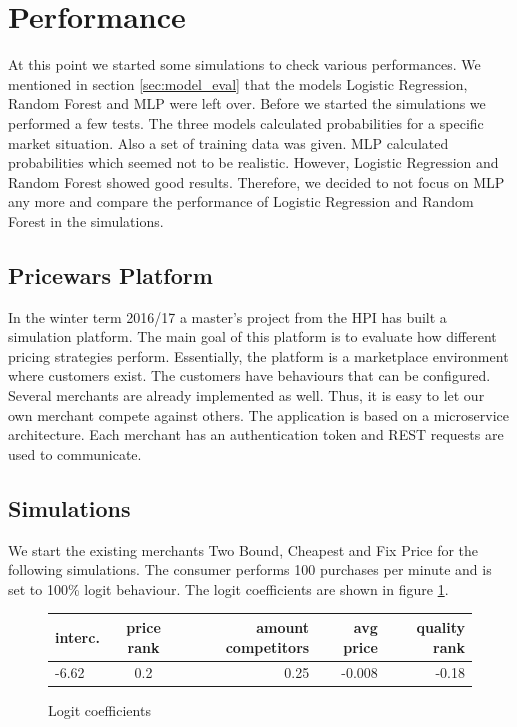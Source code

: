 \section{Performance}
    At this point we started some simulations to check various performances. We mentioned in section \ref{sec:model_eval} that the models Logistic Regression, Random Forest and MLP were left over. Before we started the simulations we performed a few tests. The three models calculated probabilities for a specific market situation. Also a set of training data was given. MLP calculated probabilities which seemed not to be realistic. However, Logistic Regression and Random Forest showed good results. Therefore, we decided to not focus on MLP any more and compare the performance of Logistic Regression and Random Forest in the simulations.

\subsection{Pricewars Platform}
    In the winter term 2016/17 a master's project from the HPI has built a simulation platform. The main goal of this platform is to evaluate how different pricing strategies perform. Essentially, the platform is a marketplace environment where customers exist. The customers have behaviours that can be configured. Several merchants are already implemented as well. Thus, it is easy to let our own merchant compete against others. The application is based on a microservice architecture. Each merchant has an authentication token and REST requests are used to communicate.

\subsection{Simulations}
    We start the existing merchants Two Bound, Cheapest and Fix Price for the following simulations. The consumer performs 100 purchases per minute and is set to 100\% logit behaviour. The logit coefficients are shown in figure \ref{fig1}.
    \begin{figure}[ht]
    \centering
        \begin{tabular}{ l | c | r | r | r}
            interc. & price rank & amount competitors & avg price & quality rank \\
            \hline  
            -6.62 & 0.2 & 0.25 & -0.008 & -0.18 \\
        \end{tabular}
    \caption{Logit coefficients}
    \label{fig1}
    \end{figure}


